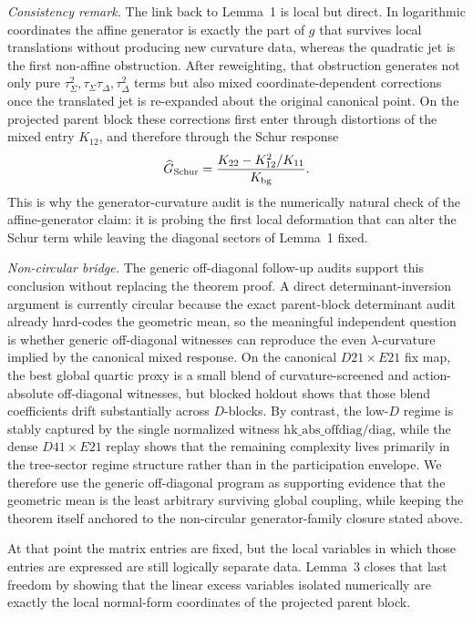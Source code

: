 \documentclass[aps,prd,onecolumn,notitlepage,nofootinbib,superscriptaddress,11pt,floatfix]{revtex4-2}
\begin{document}
\emph{Consistency remark.}
The link back to Lemma~1 is local but direct. In logarithmic coordinates the affine generator is exactly the part of \(g\) that survives local translations without producing new curvature data, whereas the quadratic jet is the first non-affine obstruction. After reweighting, that obstruction generates not only pure \(\tau_\Sigma^2,\tau_\Sigma\tau_\Delta,\tau_\Delta^2\) terms but also mixed coordinate-dependent corrections once the translated jet is re-expanded about the original canonical point. On the projected parent block these corrections first enter through distortions of the mixed entry \(K_{12}\), and therefore through the Schur response
\[
\widehat G_{\rm Schur}
=
\frac{K_{22}-K_{12}^2/K_{11}}{K_{\rm bg}}.
\]
This is why the generator-curvature audit is the numerically natural check of the affine-generator claim: it is probing the first local deformation that can alter the Schur term while leaving the diagonal sectors of Lemma~1 fixed.

\emph{Non-circular bridge.}
The generic off-diagonal follow-up audits support this conclusion without replacing the theorem proof. A direct determinant-inversion argument is currently circular because the exact parent-block determinant audit already hard-codes the geometric mean, so the meaningful independent question is whether generic off-diagonal witnesses can reproduce the even \(\lambda\)-curvature implied by the canonical mixed response. On the canonical \(D21\times E21\) fix map, the best global quartic proxy is a small blend of curvature-screened and action-absolute off-diagonal witnesses, but blocked holdout shows that those blend coefficients drift substantially across \(D\)-blocks. By contrast, the low-\(D\) regime is stably captured by the single normalized witness \(\mathrm{hk\_abs\_offdiag}/\mathrm{diag}\), while the dense \(D41\times E21\) replay shows that the remaining complexity lives primarily in the tree-sector regime structure rather than in the participation envelope. We therefore use the generic off-diagonal program as supporting evidence that the geometric mean is the least arbitrary surviving global coupling, while keeping the theorem itself anchored to the non-circular generator-family closure stated above.

At that point the matrix entries are fixed, but the local variables in which those entries are expressed are still logically separate data. Lemma~3 closes that last freedom by showing that the linear excess variables isolated numerically are exactly the local normal-form coordinates of the projected parent block.
\end{document}
